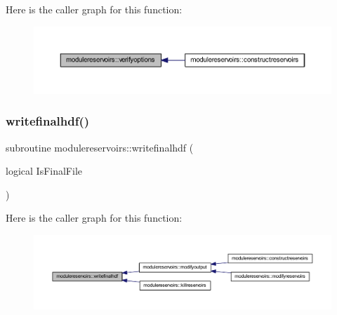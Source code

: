 Here is the caller graph for this function\+:\nopagebreak
\begin{figure}[H]
\begin{center}
\leavevmode
\includegraphics[width=350pt]{namespacemodulereservoirs_af13cf54fd0c086fab90e6f36d294bc57_icgraph}
\end{center}
\end{figure}
\mbox{\label{namespacemodulereservoirs_ab10c15bc98d09e4f38187f218fce8925}} 
\subsubsection{\texorpdfstring{writefinalhdf()}{writefinalhdf()}}
{\footnotesize\ttfamily subroutine modulereservoirs\+::writefinalhdf (\begin{DoxyParamCaption}\item[{logical}]{Is\+Final\+File }\end{DoxyParamCaption})\hspace{0.3cm}{\ttfamily [private]}}

Here is the caller graph for this function\+:\nopagebreak
\begin{figure}[H]
\begin{center}
\leavevmode
\includegraphics[width=350pt]{namespacemodulereservoirs_ab10c15bc98d09e4f38187f218fce8925_icgraph}
\end{center}
\end{figure}
\mbox{\label{namespacemodulereservoirs_acfc5816f94fa9d8f10e180691ee50039}} 
